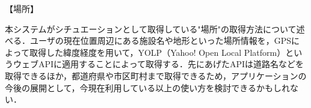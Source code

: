【場所】
\par
本システムがシチュエーションとして取得している"場所"の取得方法について述べる．ユーザの現在位置周辺にある施設名や地形といった場所情報を，GPSによって取得した緯度経度を用いて，YOLP（Yahoo! Open Local Platform）というウェブAPIに適用することによって取得する．先にあげたAPIは道路名などを取得できるほか，都道府県や市区町村まで取得できるため，アプリケーションの今後の展開として，今現在利用している以上の使い方を検討できるかもしれない．

